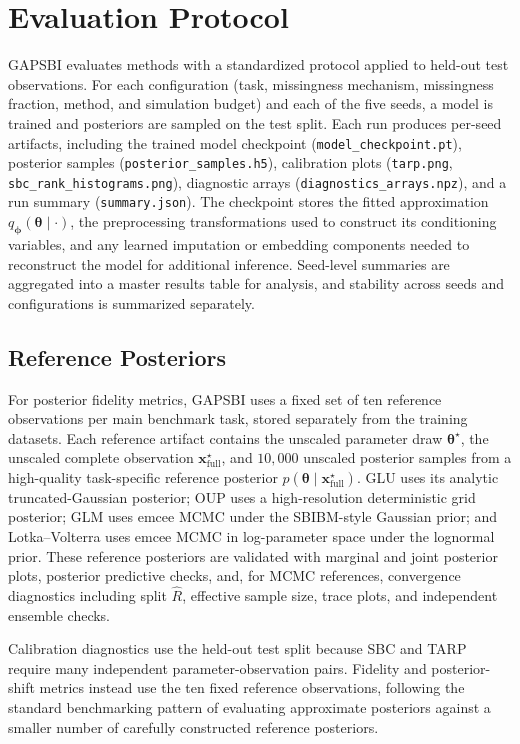 \documentclass{article} %
\providecommand{\xfull}{\mathbf{x}_{\mathrm{full}}}
\providecommand{\thetab}{\boldsymbol{\theta}}
\providecommand{\phib}{\boldsymbol{\phi}}
\begin{document}
\section{Evaluation Protocol}
\label{sec:evaluation}

GAPSBI evaluates methods with a standardized protocol applied to held-out test
observations. For each configuration (task, missingness mechanism, missingness
fraction, method, and simulation budget) and each of the five seeds, a model is
trained and posteriors are sampled on the test split. Each run produces per-seed
artifacts, including the trained model checkpoint
(\texttt{model\_checkpoint.pt}), posterior samples
(\texttt{posterior\_samples.h5}), calibration plots (\texttt{tarp.png},
\texttt{sbc\_rank\_histograms.png}), diagnostic arrays
(\texttt{diagnostics\_arrays.npz}), and a run summary (\texttt{summary.json}).
The checkpoint stores the fitted approximation $q_{\phib}(\thetab \mid \cdot)$,
the preprocessing transformations used to construct its conditioning variables,
and any learned imputation or embedding components needed to reconstruct the
model for additional inference. Seed-level summaries are aggregated into a master
results table for analysis, and stability across seeds and configurations is
summarized separately.

\subsection{Reference Posteriors}
\label{sec:eval-reference-posteriors}

For posterior fidelity metrics, GAPSBI uses a fixed set of ten reference
observations per main benchmark task, stored separately from the training datasets.
Each reference artifact contains the unscaled parameter draw $\thetab^\star$, the
unscaled complete observation $\xfull^\star$, and $10{,}000$ unscaled posterior
samples from a high-quality task-specific reference posterior
$p(\thetab \mid \xfull^\star)$. GLU uses its analytic truncated-Gaussian
posterior; OUP uses a high-resolution deterministic grid posterior; GLM uses
emcee MCMC under the SBIBM-style Gaussian prior; and Lotka--Volterra uses emcee
MCMC in log-parameter space under the lognormal prior. These reference
posteriors are validated with marginal and joint posterior plots, posterior
predictive checks, and, for MCMC references, convergence diagnostics including
split $\widehat{R}$, effective sample size, trace plots, and independent
ensemble checks.

Calibration diagnostics use the held-out test split because SBC and TARP require
many independent parameter-observation pairs. Fidelity and posterior-shift
metrics instead use the ten fixed reference observations, following the standard
benchmarking pattern of evaluating approximate posteriors against a smaller
number of carefully constructed reference posteriors.
\end{document}
